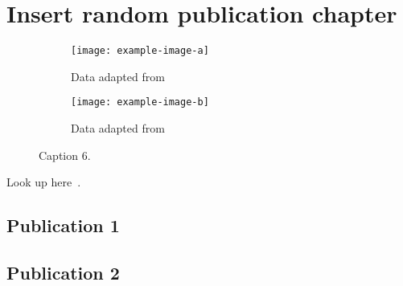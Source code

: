 \documentclass[../main.tex]{subfiles}
\begin{document}
\chapter{Insert random publication chapter}
\label{ch:Chapter5} %

\lipsum[2-4]


\begin{figure}[ht]
\centering
    \begin{subfigure}[t]{.59\columnwidth}
      \texttt{[image: example-image-a]}
      \caption{Data adapted from~\cite{Zorin:22} \label{fig:5-a}}
    \end{subfigure}
    \begin{subfigure}[t]{.39\columnwidth}
      \texttt{[image: example-image-b]}
      \caption{Data adapted from~\cite{Zorin:22}\label{fig:5-b}}
    \end{subfigure}
    \caption{Caption 6.}
    \label{fig:fig_5-1}
\end{figure}

Look up here~\cite{Zorin:22}.


\section{Publication 1}\label{publ1}

\lipsum[1-3]







\section{Publication 2}\label{publ2}
\lipsum[1-3]



\end{document}
